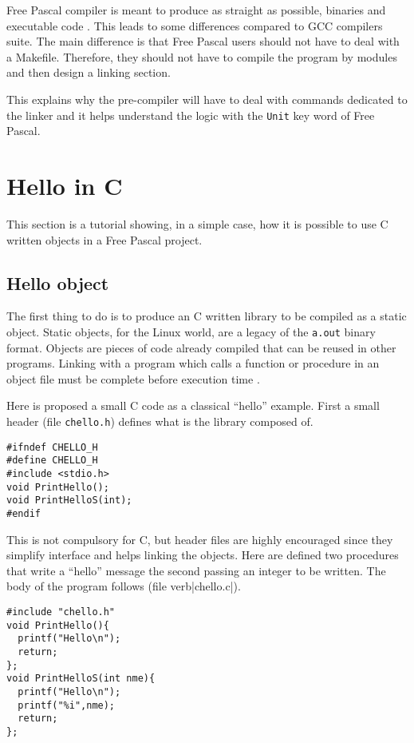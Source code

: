 \documentclass[A4paper]{article}
\begin{document}
Free Pascal compiler is meant to produce as straight as possible, binaries and
executable code \cite{FPDoc}. This leads to some differences compared to GCC
compilers suite. The main difference is that Free Pascal users should not
have to deal with a Makefile. Therefore, they should not have to compile the
program by modules and then design a linking section.

This explains why the pre-compiler will have to deal with commands dedicated to
the linker and it helps understand the logic with the \verb|Unit| key word of
Free Pascal.

\section{Hello in C}

This section is a tutorial showing, in a simple case, how it is possible to
use C written objects in a Free Pascal project.

\subsection{Hello object}

The first thing to do is to produce an C written library to be compiled as a
static object. Static objects, for the Linux world, are a legacy of the
\verb|a.out| binary format. Objects are pieces of code already compiled that
can be reused in other programs. Linking with a program which calls a function
or procedure in an object file must be complete before execution time
\cite{Drep2006}.

Here is proposed a small C code as a classical ``hello'' example. First a
small header (file \verb|chello.h|) defines what is the library composed of.

\begin{verbatim}
#ifndef CHELLO_H
#define CHELLO_H
#include <stdio.h>
void PrintHello();
void PrintHelloS(int);
#endif
\end{verbatim}

This is not compulsory for C, but header files are highly encouraged since
they simplify interface and helps linking the objects. Here are defined two
procedures that write a ``hello'' message the second passing an integer to be
written. The body of the program follows (file verb|chello.c|).

\begin{verbatim}
#include "chello.h"
void PrintHello(){
  printf("Hello\n");
  return;
};
void PrintHelloS(int nme){
  printf("Hello\n");
  printf("%i",nme);
  return;
};

\end{verbatim}
\end{document}
